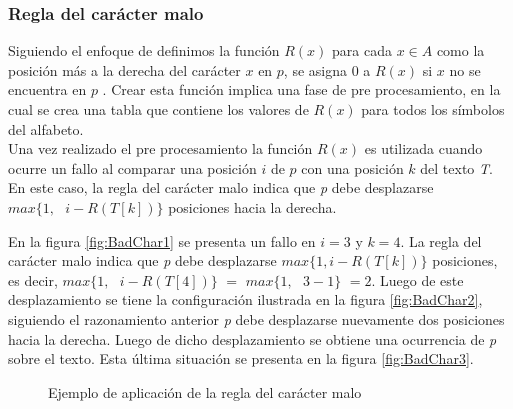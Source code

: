 \subsubsection{Regla del carácter malo}
Siguiendo el enfoque de \cite{GUS} definimos la función $R(x)$ para cada $x \in A$ como la posición más a la derecha del carácter $x$ en $p$, se asigna 0 a $R(x)$ si $x$ no se encuentra en $p$ .
Crear esta función implica una fase de pre procesamiento, en la cual se crea una tabla que contiene los valores de $R(x)$ para todos los símbolos del alfabeto.\\
Una vez realizado el pre procesamiento la función $R(x)$ es utilizada cuando ocurre un fallo al comparar una posición $i$ de $p$ con una posición $k$ del texto {\it T}. En este caso, la regla del carácter malo indica que {\it p} debe desplazarse $max\{1, \text{ } i - R(T[k])\}$ posiciones hacia la derecha.
\begin{example*}
En la figura \ref{fig:BadChar1} se presenta un fallo en $i=3$ y $k=4$. La regla del carácter malo indica que {\it p} debe desplazarse $max\{1, i - R(T[k])\}$ posiciones, es decir, $max\{1, \text{ } i - R(T[4])\}$ $=$ $max\{1, \text{ } 3 - 1\}$ $= 2$. Luego de este desplazamiento se tiene la configuración ilustrada en la figura \ref{fig:BadChar2}, siguiendo el razonamiento anterior {\it p} debe desplazarse nuevamente dos posiciones hacia la derecha. Luego de dicho desplazamiento se obtiene una ocurrencia de {\it p} sobre el texto. Esta última situación se presenta en la figura \ref{fig:BadChar3}.
\begin{figure}[H]
\centering
\quad
\quad
\caption[Ejemplo de aplicación de la regla del carácter malo]{Ejemplo de aplicación de la regla del carácter malo}
\label{fig:BadChar}
\end{figure}
\end{example*}
\myrule{}{}

